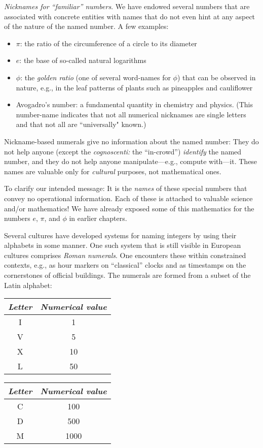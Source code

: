 \noindent
{\it Nicknames for ``familiar'' numbers}.
We have endowed several numbers that are associated with concrete entities with names that do not even hint at any aspect of the nature of the named number.  A few examples:
\begin{itemize}
\item
$\pi$: the ratio of the circumference of a circle to its diameter
\item
$e$: the base of so-called natural logarithms
\item
$\phi$: the {\it golden ratio} (one of several word-names for $\phi$) that can be observed in nature, e.g., in the leaf patterns of plants such as pineapples and cauliflower
\item
Avogadro's number: a fundamental quantity in chemistry and physics.  (This number-name indicates that not all numerical nicknames are single letters and that not all are ``universally" known.)
\end{itemize}
Nickname-based numerals give no information about the named number:  They do not help anyone (except the {\it cognoscenti:} the ``in-crowd'') {\em identify} the named number, and they do not help anyone manipulate---e.g., compute with---it.  These names are valuable only for {\em cultural} purposes, not mathematical ones.

\smallskip

To clarify our intended message: It is the {\em names} of these special numbers that convey no operational information.  Each of these is attached to valuable science and/or mathematics!  We have already exposed some of this mathematics for the numbers $e$, $\pi$, and $\phi$ in earlier chapters.

\bigskip

 

Several cultures have developed systems for naming integers by using their alphabets in some manner.  One such system that is still visible in European cultures comprises {\it Roman numerals}.  One encounters these within constrained contexts, e.g., as hour markers on ``classical'' clocks and as timestamps on the cornerstones of official buildings.  The numerals
are formed from a subset of the Latin alphabet:

\smallskip

{\small
\begin{tabular}{c|c}
{\it Letter} & {\it Numerical value} \\
\hline
I  & 1 \\
V  & 5 \\
X  & 10 \\
L  & 50
\end{tabular}
\hspace*{.5in}
\begin{tabular}{c|c}
{\it Letter} & {\it Numerical value} \\
\hline
C  & 100 \\
D  & 500 \\
M  & 1000
\end{tabular}
}

